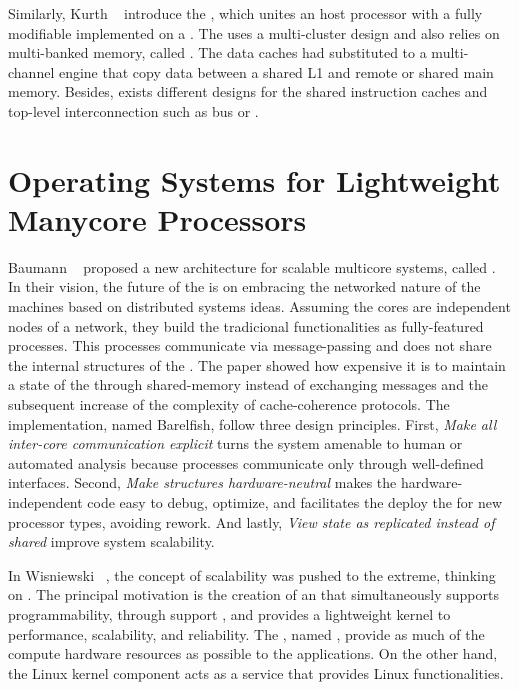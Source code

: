 	Similarly, Kurth \etal~\cite{Kurth2017} introduce the \hero, which unites an \arm
	host processor with a fully modifiable \riscv \manycore implemented on a \fpga.
	The \pmca uses a multi-cluster design and also relies on multi-banked memory, called \spm.
	The data caches had substituted to a multi-channel \dma engine that copy data
	between a shared L1 \spm and remote \spms or shared main memory.
	Besides, exists different designs for the shared instruction caches and
	top-level interconnection such as bus or \noc.

\section{Operating Systems for Lightweight Manycore Processors}
\label{sec.works.os}

	Baumann \etal~\cite{Baumann2009} proposed a new \os architecture for scalable multicore
	systems, called \multikernel.
	In their vision, the future of the \oses is on embracing the networked nature
	of the machines based on distributed systems ideas.
	Assuming the cores are independent nodes of a network, they build the tradicional
	\os functionalities as fully-featured processes.
	This processes communicate via message-passing and does not share the internal
	structures of the \os.
	The paper showed how expensive it is to maintain a state of the \os through
	shared-memory instead of exchanging messages and the subsequent increase of
	the complexity of cache-coherence protocols.
	The \multikernel implementation, named Barelfish, follow three design principles.
	First, \textit{Make all inter-core communication explicit} turns the system
	amenable to human or automated analysis because processes communicate only
	through well-defined interfaces.
	Second, \textit{Make \os structures hardware-neutral} makes the hardware-independent
	code easy to debug, optimize, and facilitates the deploy the \os for new
	processor types, avoiding rework.
	And lastly, \textit{View \os state as replicated instead of shared} improve system
	scalability.

	In Wisniewski~\cite{Wisniewski2014} \etal, the concept of scalability was pushed
	to the extreme, thinking on \hpc.
	The principal motivation is the creation of an \os that simultaneously supports
	programmability, through support \linux \api, and provides a lightweight kernel
	to performance, scalability, and reliability.
	The \os, named \mos, provide as much of the compute hardware resources as
	possible to the \hpc applications. On the other hand, the Linux kernel
	component acts as a service that provides Linux functionalities.
	
